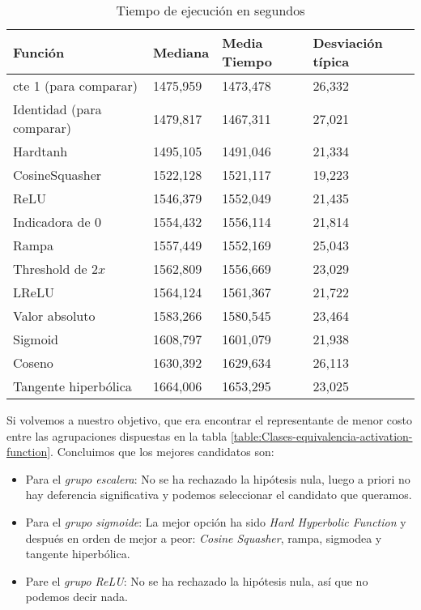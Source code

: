\begin{table}[H]
    \centering
    \begin{tabular}{|l|l|l|l|}
    \hline
        Función & Mediana & Media Tiempo & Desviación típica \\ \hline
        cte 1 (para comparar) & 1475,959 & 1473,478 & 26,332 \\ \hline
        Identidad (para comparar) & 1479,817 & 1467,311 & 27,021 \\ \hline
        Hardtanh & 1495,105 & 1491,046 & 21,334 \\ \hline
        CosineSquasher & 1522,128 & 1521,117 & 19,223 \\ \hline
        ReLU & 1546,379 & 1552,049 & 21,435 \\ \hline
        Indicadora de 0 & 1554,432 & 1556,114 & 21,814 \\ \hline
        Rampa & 1557,449 & 1552,169 & 25,043 \\ \hline
        Threshold de $2x$ & 1562,809 & 1556,669 & 23,029 \\ \hline
        LReLU & 1564,124 & 1561,367 & 21,722 \\ \hline
        Valor absoluto & 1583,266 & 1580,545 & 23,464 \\ \hline
        Sigmoid & 1608,797 & 1601,079 & 21,938 \\ \hline
        Coseno & 1630,392 & 1629,634 & 26,113 \\ \hline
        Tangente hiperbólica & 1664,006 & 1653,295 & 23,025 \\ \hline
    \end{tabular}
    \caption{Tiempo de ejecución en segundos}
    \label{Tiempos-ejecucion-comparativas}
\end{table}


Si volvemos a nuestro objetivo, que era encontrar el representante de 
menor costo entre las agrupaciones dispuestas en la tabla \ref{table:Clases-equivalencia-activation-function}. Concluimos que los mejores candidatos son: 

\begin{itemize}
    \item Para el \textit{grupo escalera}: No se ha rechazado la hipótesis nula, luego a priori no hay deferencia significativa y podemos seleccionar el candidato que queramos. 
    \item Para el \textit{grupo sigmoide}: La mejor opción ha sido \textit{Hard Hyperbolic Function} y  después en orden de mejor a peor: \textit{Cosine Squasher}, rampa, sigmodea y tangente hiperbólica.
    \item Pare el \textit{grupo ReLU}: No se ha rechazado la hipótesis nula, así que no podemos decir nada. 
\end{itemize}


